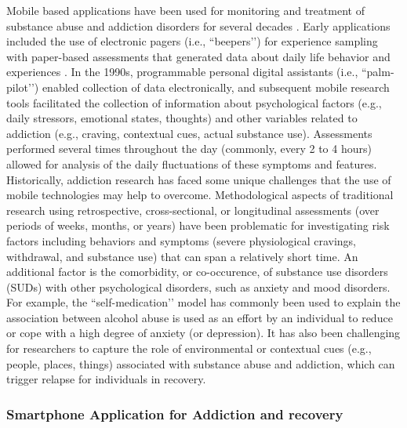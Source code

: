 \documentclass[sigconf]{acmart}
\begin{document}
Mobile based applications have been used for monitoring and treatment of 
substance abuse and addiction disorders for several decades \cite{boyer10}. 
Early applications included the use of electronic pagers (i.e., ``beepers’’) 
for experience sampling with paper-based assessments that generated data about 
daily life behavior and experiences \cite{swedenson16}. In the 1990s, programmable 
personal digital assistants (i.e., ``palm-pilot’’) enabled collection of data 
electronically, and subsequent mobile research tools facilitated the collection 
of information about psychological factors (e.g., daily stressors, emotional 
states, thoughts) and other variables related to addiction (e.g., craving, 
contextual cues, actual substance use). Assessments performed several times 
throughout the day (commonly, every 2 to 4 hours) allowed for analysis of the 
daily fluctuations of these symptoms and features. Historically, addiction 
research has faced some unique challenges that the use of mobile technologies 
may help to overcome. Methodological aspects of traditional research using 
retrospective, cross-sectional, or longitudinal assessments (over periods of 
weeks, months, or years) have been problematic for investigating risk factors 
including behaviors and symptoms (severe physiological cravings, withdrawal, 
and substance use) that can span a relatively short time. An additional factor 
is the comorbidity, or co-occurence, of substance use disorders (SUDs) with other 
psychological disorders, such as anxiety and mood disorders. For example, the 
``self-medication’’ model has commonly been used to explain the association 
between alcohol abuse is used as an effort by an individual to reduce or cope 
with a high degree of anxiety (or depression). It has also been challenging 
for researchers to capture the role of environmental or contextual cues (e.g., 
people, places, things) associated with substance abuse and addiction, which 
can trigger relapse for individuals in recovery.


\subsubsection*{Smartphone Application for Addiction and recovery}
\end{document}
